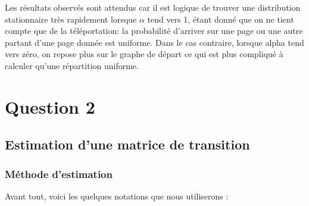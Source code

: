 \documentclass[a4paper,titlepage]{report}
\begin{document}
Les résultats observés sont attendus car il est logique de trouver une distribution stationnaire très rapidement lorsque $\alpha$ tend vers 1, étant donné que on ne tient compte que de la téléportation: la probabilité d'arriver sur une page ou une autre partant d'une page donnée est uniforme. Dans le cas contraire, lorsque alpha tend vers zéro, on repose plus sur le graphe de départ ce qui est plus compliqué à calculer qu'une répartition uniforme.
\chapter{Question 2}
\section{Estimation d'une matrice de transition}
\label{sec:estimateQ}
\subsection{Méthode d'estimation}
Avant tout, voici les quelques notations que nous utiliserons : 
\end{document}
